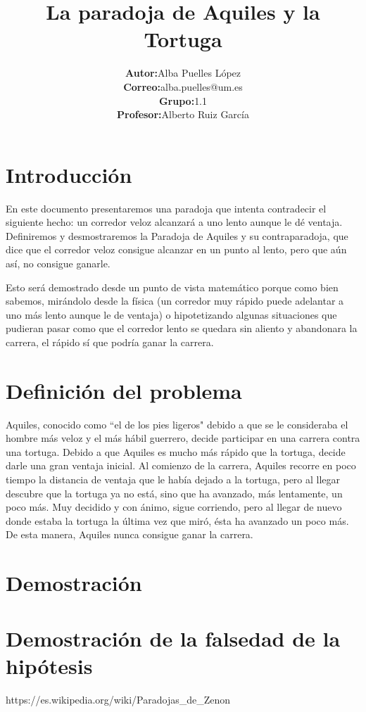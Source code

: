 \documentclass[a4paper,12pt]{article}
\date{}
\title{\textbf{La paradoja de Aquiles y la Tortuga}}
\author{\begin{tabular}{rl}
  \textbf{Autor:} & Alba Puelles López \\
  \textbf{Correo:} & alba.puelles@um.es \\
  \textbf{Grupo:} & 1.1 \\
  \textbf{Profesor:} & Alberto Ruiz García \\
\end{tabular}}
\begin{document}
 
   \maketitle
   
   \newpage

   \tableofcontents

   \newpage
   
   \section{Introducción}
   
   En este documento presentaremos una paradoja que intenta contradecir
   el siguiente hecho: un corredor veloz alcanzará a uno lento aunque le dé ventaja. 
   Definiremos y desmostraremos la Paradoja de Aquiles y su contraparadoja, que 
   dice que el corredor veloz consigue alcanzar en un punto al lento, pero que aún así,
   no consigue ganarle.
   
   Esto será demostrado desde un punto de vista matemático porque como bien sabemos, 
   mirándolo desde la física (un corredor muy rápido puede adelantar
   a uno más lento aunque le de ventaja) o hipotetizando algunas situaciones que pudieran pasar
   como que el corredor lento se quedara sin aliento y abandonara la carrera, 
   el rápido sí que podría ganar la carrera.
   
   \section{Definición del problema}
   
   Aquiles, conocido como ``el de los pies ligeros" debido a que se le consideraba 
   el hombre más veloz y el más hábil guerrero, decide participar en una carrera 
   contra una tortuga. Debido a que Aquiles es mucho más rápido que la tortuga, 
   decide darle una gran ventaja inicial. Al comienzo de la carrera, 
   Aquiles recorre en poco tiempo la distancia de ventaja que le había dejado a la tortuga, 
   pero al llegar descubre que la tortuga ya no está, sino que ha avanzado, más lentamente,
   un poco más. Muy decidido y con ánimo, sigue corriendo, pero al llegar de nuevo donde 
   estaba la tortuga la última vez que miró, ésta ha avanzado un poco más. 
   De esta manera, Aquiles nunca consigue ganar la carrera.
   
   \section{Demostración}
   
   \section{Demostración de la falsedad de la hipótesis}
      



   
   \newpage
   
   \begin{thebibliography}{99}
   
       https://es.wikipedia.org/wiki/Paradojas\_de\_Zenon
      
      
   \end{thebibliography}
  
\end{document}

